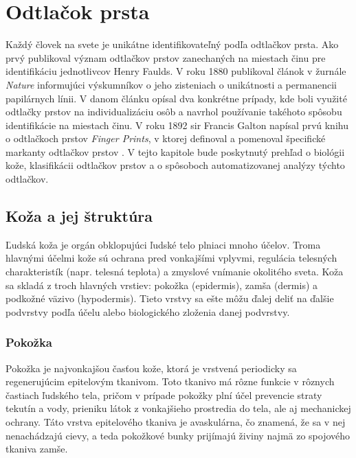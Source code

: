 
\chapter{Odtlačok prsta} \label{kap:odtlacok}
  Každý človek na svete je unikátne identifikovateľný podľa odtlačkov prsta. Ako prvý publikoval význam odtlačkov prstov zanechaných na miestach činu
  pre identifikáciu jednotlivcov Henry Faulds. V roku 1880 publikoval článok v žurnále \emph{Nature} informujúci výskumníkov o jeho zisteniach o unikátnosti
  a permanencii papilárnych línii. V danom článku opísal dva konkrétne prípady, kde boli využité odtlačky prstov na individualizáciu osôb a navrhol
  používanie takéhoto spôsobu identifikácie na miestach činu. V roku 1892 sir Francis Galton napísal prvú knihu o odtlačkoch
  prstov \emph{Finger Prints}, v ktorej definoval a pomenoval špecifické markanty odtlačkov prstov \cite{FingerprintSrcBook}.
  V tejto kapitole bude poskytnutý prehľad o biológii kože, klasifikácii odtlačkov prstov a o spôsoboch automatizovanej analýzy týchto odtlačkov.
  
  
  \section{Koža a jej štruktúra}
  Ľudská koža je orgán obklopujúci ľudské telo plniaci mnoho účelov. Troma hlavnými účelmi kože sú ochrana pred vonkajšími vplyvmi, regulácia
  telesných charakteristík (napr. telesná teplota) a zmyslové vnímanie okolitého sveta.
  Koža sa skladá z troch hlavných vrstiev: pokožka (epidermis), zamša (dermis) a podkožné väzivo (hypodermis). Tieto vrstvy sa ešte môžu ďalej deliť
  na ďalšie podvrstvy podľa účelu alebo biologického zloženia danej podvrstvy.

  \subsection{Pokožka}
  Pokožka je najvonkajšou časťou kože, ktorá je vrstvená periodicky sa regenerujúcim epitelovým tkanivom. Toto tkanivo má rôzne funkcie v rôznych
  častiach ľudského tela, pričom v prípade pokožky plní účel prevencie straty tekutín a vody, prieniku látok z vonkajšieho prostredia do tela, ale aj
  mechanickej ochrany. Táto vrstva epitelového tkaniva je avaskulárna, čo znamená, že sa v nej nenachádzajú cievy, a teda pokožkové bunky prijímajú živiny
  najmä zo spojového tkaniva zamše.
  
